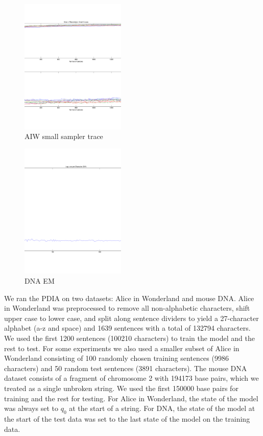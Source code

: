 \begin{figure}[htbp]
\begin{center}
\includegraphics[width=5cm]{results/aiw_small_sampler_trace}
\caption{AIW small sampler trace }
\label{fig:aiw_small_sampler_trace}
\end{center}
\end{figure}

\begin{figure}[htbp]
\begin{center}
\includegraphics[width=5cm]{results/dna_hmm_baseline}
\caption{DNA EM }
\label{fig:dna_hmm_baseline}
\end{center}
\end{figure}


We ran the PDIA on two datasets: Alice in Wonderland and mouse DNA.  Alice in Wonderland was preprocessed to remove all non-alphabetic characters, shift upper case to lower case, and split along sentence dividers to yield a 27-character alphabet (a-z and space) and 1639 sentences with a total of 132794 characters.  We used the first 1200 sentences (100210 characters) to train the model and the rest to test.  For some experiments we also used a smaller subset of Alice in Wonderland consisting of 100 randomly chosen training sentences (9986 characters) and 50 random test sentences (3891 characters).  The mouse DNA dataset consists of a fragment of chromosome 2 with 194173 base pairs, which we treated as a single unbroken string.  We used the first 150000 base pairs for training and the rest for testing.  For Alice in Wonderland, the state of the model was always set to $q_0$ at the start of a string.  For DNA, the state of the model at the start of the test data was set to the last state of the model on the training data.

